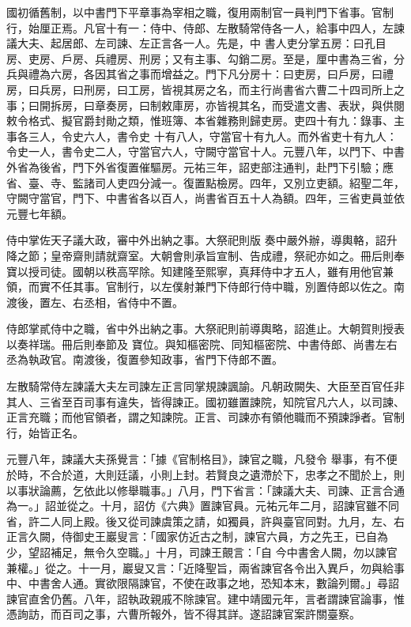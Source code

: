 \begin{pinyinscope}
 國初循舊制，以中書門下平章事為宰相之職，復用兩制官一員判門下省事。官制行，始厘正焉。凡官十有一：侍中、侍郎、左散騎常侍各一人，給事中四人，左諫議大夫、起居郎、左司諫、左正言各一人。先是，中
 書人吏分掌五房：曰孔目房、吏房、戶房、兵禮房、刑房；又有主事、勾銷二房。至是，厘中書為三省，分兵與禮為六房，各因其省之事而增益之。門下凡分房十：曰吏房，曰戶房，曰禮房，曰兵房，曰刑房，曰工房，皆視其房之名，而主行尚書省六曹二十四司所上之事；曰開拆房，曰章奏房，曰制敕庫房，亦皆視其名，而受遣文書、表狀，與供閱敕令格式、擬官爵封勛之類，惟班簿、本省雜務則歸吏房。吏四十有九：錄事、主事各三人，令史六人，書令史
 十有八人，守當官十有九人。而外省吏十有九人：令史一人，書令史二人，守當官六人，守闕守當官十人。元豐八年，以門下、中書外省為後省，門下外省復置催驅房。元祐三年，詔吏部注通判，赴門下引驗；應省、臺、寺、監諸司人吏四分減一。復置點檢房。四年，又別立吏額。紹聖二年，守闕守當官，門下、中書省各以百人，尚書省百五十人為額。四年，三省吏員並依元豐七年額。



 侍中掌佐天子議大政，審中外出納之事。大祭祀則版
 奏中嚴外辦，導輿輅，詔升降之節；皇帝齋則請就齋室。大朝會則承旨宣制、告成禮，祭祀亦如之。冊后則奉寶以授司徒。國朝以秩高罕除。知建隆至熙寧，真拜侍中才五人，雖有用他官兼領，而實不任其事。官制行，以左僕射兼門下侍郎行侍中職，別置侍郎以佐之。南渡後，置左、右丞相，省侍中不置。



 侍郎掌貳侍中之職，省中外出納之事。大祭祀則前導輿略，詔進止。大朝賀則授表以奏祥瑞。冊后則奉節及
 寶位。與知樞密院、同知樞密院、中書侍郎、尚書左右丞為執政官。南渡後，復置參知政事，省門下侍郎不置。



 左散騎常侍左諫議大夫左司諫左正言同掌規諫諷諭。凡朝政闕失、大臣至百官任非其人、三省至百司事有違失，皆得諫正。國初雖置諫院，知院官凡六人，以司諫、正言充職；而他官領者，謂之知諫院。正言、司諫亦有領他職而不預諫諍者。官制行，始皆正名。



 元豐八年，諫議大夫孫覺言：「據《官制格目》，諫官之職，凡發令
 舉事，有不便於時，不合於道，大則廷議，小則上封。若賢良之遺滯於下，忠孝之不聞於上，則以事狀論薦，乞依此以修舉職事。」八月，門下省言：「諫議大夫、司諫、正言合通為一。」詔並從之。十月，詔仿《六典》置諫官員。元祐元年二月，詔諫官雖不同省，許二人同上殿。後又從司諫虞策之請，如獨員，許與臺官同對。九月，左、右正言久闕，侍御史王巖叟言：「國家仿近古之制，諫官六員，方之先王，已自為少，望詔補足，無令久空職。」十月，司諫王覿言：「自
 今中書舍人闕，勿以諫官兼權。」從之。十一月，巖叟又言：「近降聖旨，兩省諫官各令出入異戶，勿與給事中、中書舍人通。實欲限隔諫官，不使在政事之地，恐知本末，數論列爾。」尋詔諫官直舍仍舊。八年，詔執政親戚不除諫官。建中靖國元年，言者謂諫官論事，惟憑詢訪，而百司之事，六曹所報外，皆不得其詳。遂詔諫官案許關臺察。




\end{pinyinscope}
